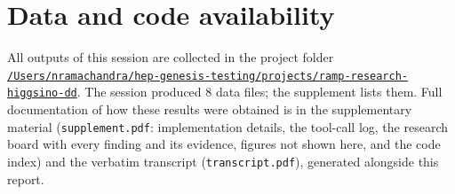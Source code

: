 \documentclass[11pt,a4paper]{article}
\begin{document}
\section*{Data and code availability}
All outputs of this session are collected in the project folder \href{file:///Users/nramachandra/hep-genesis-testing/projects/ramp-research-higgsino-dd}{\texttt{/\allowbreak{}Users/\allowbreak{}nramachandra/\allowbreak{}hep-genesis-testing/\allowbreak{}projects/\allowbreak{}ramp-research-higgsino-dd}}.
The session produced 8 data files; the supplement lists them.
Full documentation of how these results were obtained is in the supplementary material (\texttt{supplement.pdf}: implementation details, the tool-call log, the research board with every finding and its evidence, figures not shown here, and the code index) and the verbatim transcript (\texttt{transcript.pdf}), generated alongside this report.
\end{document}
